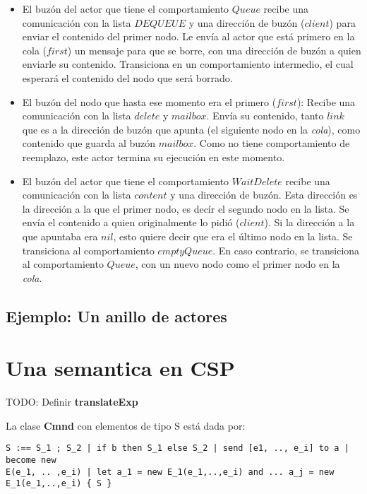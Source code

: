 \begin{itemize}
 \item El buzón del actor que tiene el comportamiento $Queue$ recibe una comunicación con la lista $DEQUEUE$ y una dirección de buzón ($client$) para enviar el contenido del primer nodo.
 \subitem Le envía al actor que está primero en la cola ($first$) un mensaje para que se borre, con una dirección de buzón a quien enviarle su contenido.
 \subitem Transiciona en un comportamiento intermedio, el cual esperará el contenido del nodo que será borrado.
 \item El buzón del nodo que hasta ese momento era el primero ($first$):
 \subitem Recibe una comunicación con la lista $delete$ y $mailbox$.
 \subitem Envía su contenido, tanto $link$ que es a la dirección de buzón que apunta (el siguiente nodo en la \textit{cola}), como contenido que guarda al buzón $mailbox$. Como no tiene comportamiento de reemplazo, este actor termina su ejecución en este momento.
 \item El buzón del actor que tiene el comportamiento $WaitDelete$ recibe una comunicación con la lista $content$ y una dirección de buzón. Esta dirección es la dirección a la que el primer nodo, es decír el segundo nodo en la lista.
 \subitem Se envía el contenido a quien originalmente lo pidió ($client$).
 \subitem Si la dirección a la que apuntaba era $nil$, esto quiere decir que era el último nodo en la lista. Se transiciona al comportamiento $emptyQueue$.
 \subitem En caso contrario, se transiciona al comportamiento $Queue$, con un nuevo nodo como el primer nodo en la \textit{cola}.
\end{itemize}

\subsection{Ejemplo: Un anillo de actores}

\section{Una semantica en CSP}

TODO: Definir \textbf{translateExp}

La clase \textbf{Cmnd} con elementos de tipo S está dada por:

\begin{verbatim}
S :== S_1 ; S_2 | if b then S_1 else S_2 | send [e1, .., e_i] to a | become new
E(e_1, .. ,e_i) | let a_1 = new E_1(e_1,..,e_i) and ... a_j = new
E_1(e_1,..,e_i) { S } 
\end{verbatim}

